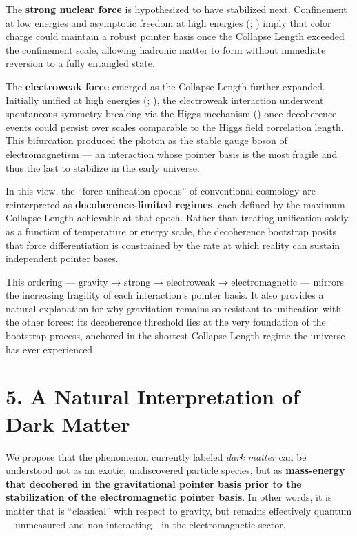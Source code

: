 \documentclass[
]{article}
\begin{document}
The \textbf{strong nuclear force} is hypothesized to have stabilized
next. Confinement at low energies and asymptotic freedom at high
energies (;
) imply that color charge
could maintain a robust pointer basis once the Collapse Length exceeded
the confinement scale, allowing hadronic matter to form without
immediate reversion to a fully entangled state.

The \textbf{electroweak force} emerged as the Collapse Length further
expanded. Initially unified at high energies
(;
), the electroweak
interaction underwent spontaneous symmetry breaking via the Higgs
mechanism () once decoherence
events could persist over scales comparable to the Higgs field
correlation length. This bifurcation produced the photon as the stable
gauge boson of electromagnetism --- an interaction whose pointer basis
is the most fragile and thus the last to stabilize in the early
universe.

In this view, the ``force unification epochs'' of conventional cosmology
are reinterpreted as \textbf{decoherence-limited regimes}, each defined
by the maximum Collapse Length achievable at that epoch. Rather than
treating unification solely as a function of temperature or energy
scale, the decoherence bootstrap posits that force differentiation is
constrained by the rate at which reality can sustain independent pointer
bases.

This ordering --- gravity → strong → electroweak → electromagnetic ---
mirrors the increasing fragility of each interaction's pointer basis. It
also provides a natural explanation for why gravitation remains so
resistant to unification with the other forces: its decoherence
threshold lies at the very foundation of the bootstrap process, anchored
in the shortest Collapse Length regime the universe has ever
experienced.

\section{5. A Natural Interpretation of Dark
Matter}\label{a-natural-interpretation-of-dark-matter}

We propose that the phenomenon currently labeled \emph{dark matter} can
be understood not as an exotic, undiscovered particle species, but as
\textbf{mass-energy that decohered in the gravitational pointer basis
prior to the stabilization of the electromagnetic pointer basis}. In
other words, it is matter that is ``classical'' with respect to gravity,
but remains effectively quantum---unmeasured and non-interacting---in
the electromagnetic sector.
\end{document}
